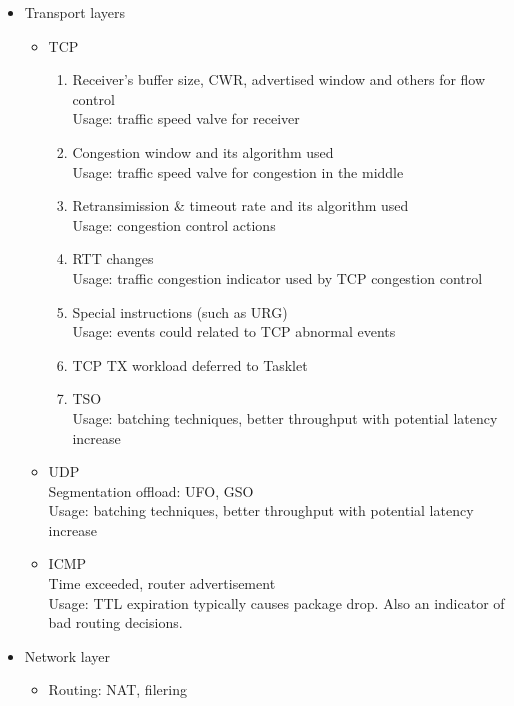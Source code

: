 \begin{itemize}
\begin{itemize}
\begin{itemize}
      \item Transport layers
        \begin{itemize}
          \item TCP
            \begin{enumerate}
              \item Receiver's buffer size, CWR, advertised window and others for flow control \autocite{DBLP:books/MKP/Larry2011} \\
                Usage: traffic speed valve for receiver
              \item Congestion window and its algorithm used  \autocite{DBLP:books/MKP/Larry2011,DBLP:conf/sigcomm/AlizadehGMPPPSS10}\\
                Usage: traffic speed valve for congestion in the middle
              \item Retransimission & timeout rate and its algorithm used \\
                Usage: congestion control actions
              \item RTT changes \\
                Usage: traffic congestion indicator used by TCP congestion control
              \item Special instructions (such as URG) \\
                Usage: events could related to TCP abnormal events
              \item TCP TX workload deferred to Tasklet \\
              \item TSO \\
                Usage: batching techniques, better throughput with potential latency increase
            \end{enumerate}
      \item UDP \\
        Segmentation offload: UFO, GSO \\
        Usage: batching techniques, better throughput with potential latency increase
      \item ICMP \\
        Time exceeded, router advertisement \\
        Usage: TTL expiration typically causes package drop. Also an indicator of bad routing decisions.
    \end{itemize}
   \item Network layer
        \begin{itemize}
        \item {Routing: NAT, filering} \\

\end{itemize}
\end{itemize}
\end{itemize}
\end{itemize}
